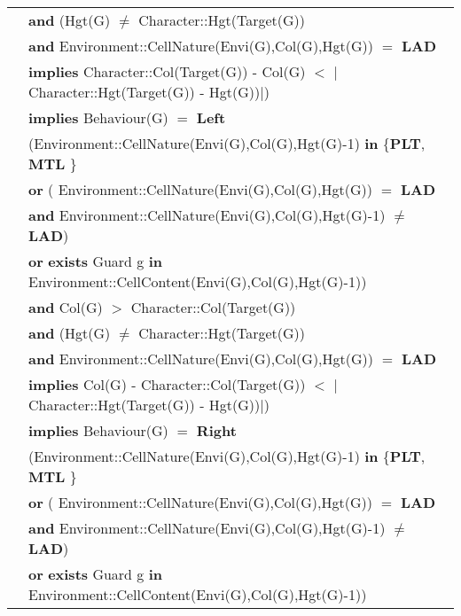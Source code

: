 \documentclass[8pt]{article}
\begin{document}
{\begin{longtable}{rl}
  & \quad\quad \textbf{and} (\textrm{Hgt(G)} $\neq$ \textrm{Character::Hgt(Target(G))} \\
  & \quad\quad\quad\quad \textbf{and} \textrm{Environment::CellNature(Envi(G),Col(G),Hgt(G))} $=$ \textbf{LAD}\\
  & \quad\quad\quad\quad \textbf{implies} \textrm{Character::Col(Target(G)) - Col(G)} $<$ $|$\textrm{Character::Hgt(Target(G)) - Hgt(G)})$|$) \\
  & \quad\quad \textbf{implies} \textrm{Behaviour(G)} $=$ \textbf{Left} \\ 
  & (\textrm{Environment::CellNature(Envi(G),Col(G),Hgt(G)-1)} \textbf{in} \{\textbf{PLT}, \textbf{MTL}  \} \\
  & \quad\quad\quad\quad \textbf{or} ( \textrm{Environment::CellNature(Envi(G),Col(G),Hgt(G))} $=$ \textbf{LAD} \\
  & \quad\quad\quad\quad\quad\quad \textbf{and} \textrm{Environment::CellNature(Envi(G),Col(G),Hgt(G)-1)} $\neq$ \textbf{LAD}) \\
  & \quad\quad\quad\quad \textbf{or} \textbf{exists} \textrm{Guard} g \textbf{in} \textrm{Environment::CellContent(Envi(G),Col(G),Hgt(G)-1)}) \\
  & \quad\quad \textbf{and} \textrm{Col(G)} $>$ \textrm{Character::Col(Target(G))} \\
  & \quad\quad \textbf{and} (\textrm{Hgt(G)} $\neq$ \textrm{Character::Hgt(Target(G))} \\
  & \quad\quad\quad\quad \textbf{and} \textrm{Environment::CellNature(Envi(G),Col(G),Hgt(G))} $=$ \textbf{LAD}\\
  & \quad\quad\quad\quad \textbf{implies} \textrm{Col(G) - Character::Col(Target(G))} $<$ $|$\textrm{Character::Hgt(Target(G)) - Hgt(G)})$|$) \\
  & \quad\quad \textbf{implies} \textrm{Behaviour(G)} $=$ \textbf{Right} \\
  & (\textrm{Environment::CellNature(Envi(G),Col(G),Hgt(G)-1)} \textbf{in} \{\textbf{PLT}, \textbf{MTL}  \} \\
  & \quad\quad\quad\quad \textbf{or} ( \textrm{Environment::CellNature(Envi(G),Col(G),Hgt(G))} $=$ \textbf{LAD} \\
  & \quad\quad\quad\quad\quad\quad \textbf{and} \textrm{Environment::CellNature(Envi(G),Col(G),Hgt(G)-1)} $\neq$ \textbf{LAD}) \\
  & \quad\quad\quad\quad \textbf{or} \textbf{exists} \textrm{Guard} g \textbf{in} \textrm{Environment::CellContent(Envi(G),Col(G),Hgt(G)-1)}) \\

\end{longtable}}
\end{document}
